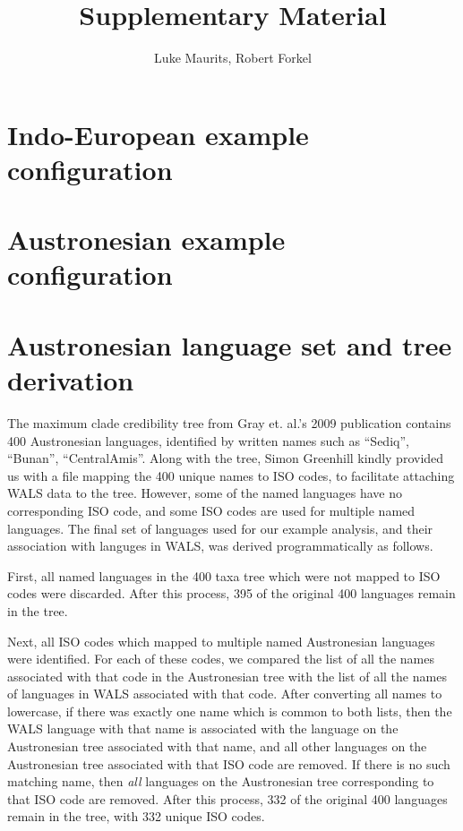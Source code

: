 \documentclass[article,10pt]{scrartcl}
\begin{document}
\title{Supplementary Material}
\author{Luke Maurits, Robert Forkel}
\maketitle

\section{Indo-European example configuration}

\begin{alltt}

\end{alltt}

\section{Austronesian example configuration}

\begin{alltt}

\end{alltt}

\section{Austronesian language set and tree derivation}

The maximum clade credibility tree from Gray et. al.'s 2009 publication contains 400 Austronesian languages, identified by written names such as ``Sediq'', ``Bunan'', ``CentralAmis''.  Along with the tree, Simon Greenhill kindly provided us with a file mapping the 400 unique names to ISO codes, to facilitate attaching WALS data to the tree.  However, some of the named languages have no corresponding ISO code, and some ISO codes are used for multiple named languages.  The final set of languages used for our example analysis, and their association with languges in WALS, was derived programmatically as follows.

First, all named languages in the 400 taxa tree which were not mapped to ISO codes were discarded.  After this process, 395 of the original 400 languages remain in the tree.

Next, all ISO codes which mapped to multiple named Austronesian languages were identified.  For each of these codes, we compared the list of all the names associated with that code in the Austronesian tree with the list of all the names of languages in WALS associated with that code.  After converting all names to lowercase, if there was exactly one name which is common to both lists, then the WALS language with that name is associated with the language on the Austronesian tree associated with that name, and all other languages on the Austronesian tree associated with that ISO code are removed.  If there is no such matching name, then \emph{all} languages on the Austronesian tree corresponding to that ISO code are removed.  After this process, 332 of the original 400 languages remain in the tree, with 332 unique ISO codes.
\end{document}
